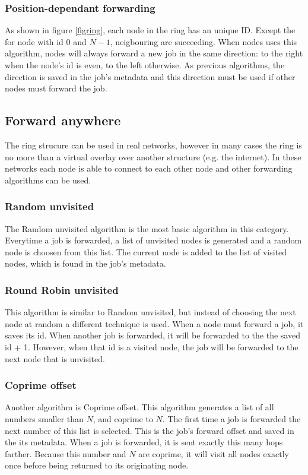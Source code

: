 \documentclass[10pt,a4paper]{article}
\begin{document}
\subsubsection{Position-dependant forwarding}
As shown in figure \ref{figring}, each node in the ring has an unique ID. Except the for node with id $0$ and $N-1$, neigbouring are succeeding. When nodes uses this algorithm, nodes will always forward a new job in the same direction: to the right when the node's id is even, to the left otherwise. As previous algorithms, the direction is saved in the job's metadata and this direction must be used if other nodes must forward the job.

\subsection{Forward anywhere}
The ring strucure can be used in real networks, however in many cases the ring is no more than a virtual overlay over another structure (e.g. the internet). In these networks each node is able to connect to each other node and other forwarding algorithms can be used.

\subsubsection{Random unvisited}
The Random unvisited algorithm is the most basic algorithm in this category. Everytime a job is forwarded, a list of unvisited nodes is generated and a random node is choosen from this list. The current node is added to the list of visited nodes, which is found in the job's metadata.

\subsubsection{Round Robin unvisited}
This algorithm is similar to Random unvisited, but instead of choosing the next node at random a different technique is used. When a node must forward a job, it saves its id. When another job is forwarded, it will be forwarded to the the saved id + 1. However, when that id is a visited node, the job will be forwarded to the next node that is unvisited.

\subsubsection{Coprime offset}
Another algorithm is Coprime offset. This algorithm generates a list of all numbers smaller than $N$, and coprime to $N$. The first time a job is forwarded the next number of this list is selected. This is the job's forward offset and saved in the its metadata. When a job is forwarded, it is sent exactly this many hops farther. Because this number and $N$ are coprime, it will visit all nodes exactly once before being returned to its originating node. 
\end{document}
